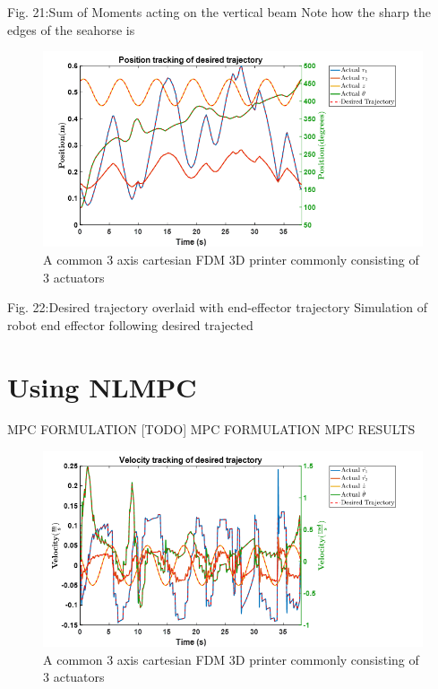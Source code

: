 \documentclass{UoNMCHA}
\numberwithin{equation}{section}
\begin{document}
	Fig. 21:Sum of Moments acting on the vertical beam
	Note how the sharp the edges of the seahorse is
	
	\begin{figure}[H]
		\begin{center}
			\includegraphics[width=.8\linewidth]{figs/Picture33}
			\caption{A  common 3 axis cartesian FDM 3D printer commonly consisting of 3 actuators}
			\label{figs/Picture33}
		\end{center}
	\end{figure}
	
	Fig. 22:Desired trajectory overlaid with end-effector trajectory
	Simulation of robot end effector following desired trajected
	
	\section{Using NLMPC}
	
	MPC FORMULATION
	[TODO] MPC FORMULATION
	MPC RESULTS
	
	\begin{figure}[H]
		\begin{center}
			\includegraphics[width=.8\linewidth]{figs/Picture34}
			\caption{A  common 3 axis cartesian FDM 3D printer commonly consisting of 3 actuators}
			\label{figs/Picture34}
		\end{center}
	\end{figure}
	
\end{document}
